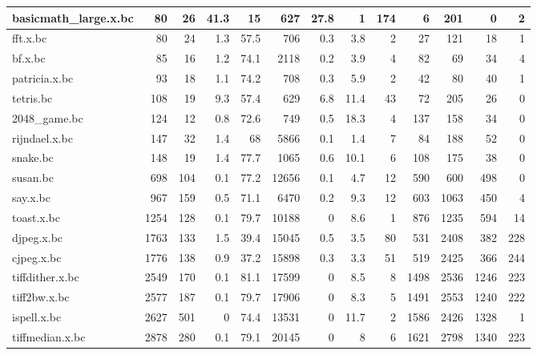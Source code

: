 \begin{tabular}{|l|r|r|r|r|r|r|r|r|r|r|r|r|}
\hline
 basicmath\_large.x.bc &       80 &   26 &   41.3 &     15   &     627 &   27.8 &      1   &   174 &       6 &        201 &         0 &       2 \\
\hline
 fft.x.bc             &       80 &   24 &    1.3 &     57.5 &     706 &    0.3 &      3.8 &     2 &      27 &        121 &        18 &       1 \\
\hline
 bf.x.bc              &       85 &   16 &    1.2 &     74.1 &    2118 &    0.2 &      3.9 &     4 &      82 &         69 &        34 &       4 \\
\hline
 patricia.x.bc        &       93 &   18 &    1.1 &     74.2 &     708 &    0.3 &      5.9 &     2 &      42 &         80 &        40 &       1 \\
\hline
 tetris.bc            &      108 &   19 &    9.3 &     57.4 &     629 &    6.8 &     11.4 &    43 &      72 &        205 &        26 &       0 \\
\hline
 2048\_game.bc         &      124 &   12 &    0.8 &     72.6 &     749 &    0.5 &     18.3 &     4 &     137 &        158 &        34 &       0 \\
\hline
 rijndael.x.bc        &      147 &   32 &    1.4 &     68   &    5866 &    0.1 &      1.4 &     7 &      84 &        188 &        52 &       0 \\
\hline
 snake.bc             &      148 &   19 &    1.4 &     77.7 &    1065 &    0.6 &     10.1 &     6 &     108 &        175 &        38 &       0 \\
\hline
 susan.bc             &      698 &  104 &    0.1 &     77.2 &   12656 &    0.1 &      4.7 &    12 &     590 &        600 &       498 &       0 \\
\hline
 say.x.bc             &      967 &  159 &    0.5 &     71.1 &    6470 &    0.2 &      9.3 &    12 &     603 &       1063 &       450 &       4 \\
\hline
 toast.x.bc           &     1254 &  128 &    0.1 &     79.7 &   10188 &    0   &      8.6 &     1 &     876 &       1235 &       594 &      14 \\
\hline
 djpeg.x.bc           &     1763 &  133 &    1.5 &     39.4 &   15045 &    0.5 &      3.5 &    80 &     531 &       2408 &       382 &     228 \\
\hline
 cjpeg.x.bc           &     1776 &  138 &    0.9 &     37.2 &   15898 &    0.3 &      3.3 &    51 &     519 &       2425 &       366 &     244 \\
\hline
 tiffdither.x.bc      &     2549 &  170 &    0.1 &     81.1 &   17599 &    0   &      8.5 &     8 &    1498 &       2536 &      1246 &     223 \\
\hline
 tiff2bw.x.bc         &     2577 &  187 &    0.1 &     79.7 &   17906 &    0   &      8.3 &     5 &    1491 &       2553 &      1240 &     222 \\
\hline
 ispell.x.bc          &     2627 &  501 &    0   &     74.4 &   13531 &    0   &     11.7 &     2 &    1586 &       2426 &      1328 &       1 \\
\hline
 tiffmedian.x.bc      &     2878 &  280 &    0.1 &     79.1 &   20145 &    0   &      8   &     6 &    1621 &       2798 &      1340 &     223 \\
\hline
\end{tabular}
